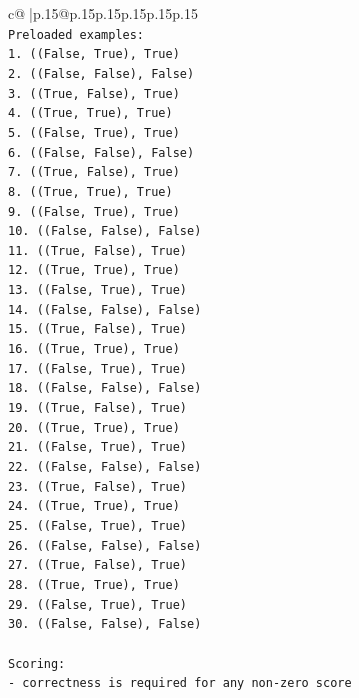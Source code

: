\documentclass{article}
\begin{document}
{\begin{supertabular}{c@{$\;$}|p{.15\linewidth}@{}p{.15\linewidth}p{.15\linewidth}p{.15\linewidth}p{.15\linewidth}p{.15\linewidth}}
{{{\\ 
\texttt{Preloaded examples:} \\
\texttt{1. ((False, True), True)} \\
\texttt{2. ((False, False), False)} \\
\texttt{3. ((True, False), True)} \\
\texttt{4. ((True, True), True)} \\
\texttt{5. ((False, True), True)} \\
\texttt{6. ((False, False), False)} \\
\texttt{7. ((True, False), True)} \\
\texttt{8. ((True, True), True)} \\
\texttt{9. ((False, True), True)} \\
\texttt{10. ((False, False), False)} \\
\texttt{11. ((True, False), True)} \\
\texttt{12. ((True, True), True)} \\
\texttt{13. ((False, True), True)} \\
\texttt{14. ((False, False), False)} \\
\texttt{15. ((True, False), True)} \\
\texttt{16. ((True, True), True)} \\
\texttt{17. ((False, True), True)} \\
\texttt{18. ((False, False), False)} \\
\texttt{19. ((True, False), True)} \\
\texttt{20. ((True, True), True)} \\
\texttt{21. ((False, True), True)} \\
\texttt{22. ((False, False), False)} \\
\texttt{23. ((True, False), True)} \\
\texttt{24. ((True, True), True)} \\
\texttt{25. ((False, True), True)} \\
\texttt{26. ((False, False), False)} \\
\texttt{27. ((True, False), True)} \\
\texttt{28. ((True, True), True)} \\
\texttt{29. ((False, True), True)} \\
\texttt{30. ((False, False), False)} \\
\\ 
\texttt{Scoring:} \\
\texttt{{-} correctness is required for any non{-}zero score} \\
}}}
\end{supertabular}}
\end{document}
